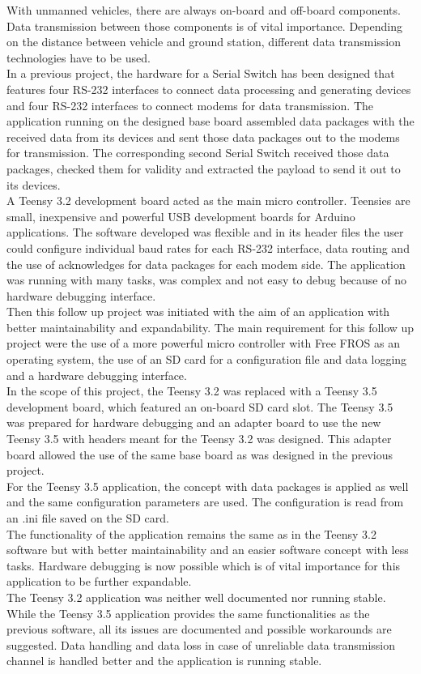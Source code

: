 %
With unmanned vehicles, there are always on-board and off-board components. Data transmission between those components is of vital importance. Depending on the distance between vehicle and ground station, different data transmission technologies have to be used. \\
In a previous project, the hardware for a Serial Switch has been designed that features four RS-232 interfaces to connect data processing and generating devices and four RS-232 interfaces to connect modems for data transmission. The application running on the designed base board assembled data packages with the received data from its devices and sent those data packages out to the modems for transmission. The corresponding second Serial Switch received those data packages, checked them for validity and extracted the payload to send it out to its devices.\\
A Teensy 3.2 development board acted as the main micro controller. Teensies are small, inexpensive and powerful USB development boards for Arduino applications. The software developed was flexible and in its header files the user could configure individual baud rates for each RS-232 interface, data routing and the use of acknowledges for data packages for each modem side. The application was running with many tasks, was complex and not easy to debug because of no hardware debugging interface.\\
Then this follow up project was initiated with the aim of an application with better maintainability and expandability. The main requirement for this follow up project were the use of a more powerful micro controller with Free FROS as an operating system, the use of an SD card for a configuration file and data logging and a hardware debugging interface.\\
In the scope of this project, the Teensy 3.2 was replaced with a Teensy 3.5 development board, which featured an on-board SD card slot. The Teensy 3.5 was prepared for hardware debugging and an adapter board to use the new Teensy 3.5 with headers meant for the Teensy 3.2 was designed. This adapter board allowed the use of the same base board as was designed in the previous project.\\
For the Teensy 3.5 application, the concept with data packages is applied as well and the same configuration parameters are used. The configuration is read from an .ini file saved on the SD card.\\
The functionality of the application remains the same as in the Teensy 3.2 software but with better maintainability and an easier software concept with less tasks. Hardware debugging is now possible which is of vital importance for this application to be further expandable.\\
The Teensy 3.2 application was neither well documented nor running stable. While the Teensy 3.5 application provides the same functionalities as the previous software, all its issues are documented and possible workarounds are suggested. Data handling and data loss in case of unreliable data transmission channel is handled better and the application is running stable.